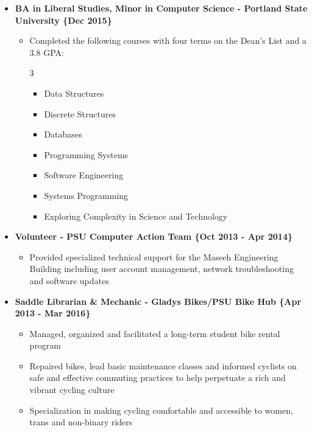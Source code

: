 \begin{itemize}
\item \textbf{BA in Liberal Studies, Minor in Computer Science - Portland State University \{Dec 2015\}}
\begin{itemize}
\item Completed the following courses with four terms on the Dean’s List and a 3.8 GPA:
\begin{multicols}{3}
\begin{itemize}
    \item Data Structures
    \item Discrete Structures
    \item Databases
    \item Programming Systems
    \item Software Engineering
    \item Systems Programming
    \item Exploring Complexity in Science and Technology
\end{itemize}
\end{multicols}
\end{itemize}


\item \textbf{Volunteer - PSU Computer Action Team  \{Oct 2013 - Apr 2014\}}
\begin{itemize}
\item Provided specialized technical support for the Maseeh Engineering Building including user account management, network troubleshooting and software updates
\end{itemize}


\item \textbf{Saddle Librarian \& Mechanic - Gladys Bikes/PSU Bike Hub  \{Apr 2013 - Mar 2016\}}
\begin{itemize}
\item Managed, organized and facilitated a long-term student bike rental program
\item Repaired bikes, lead basic maintenance classes and informed cyclists on safe and effective commuting practices to help perpetuate a rich and vibrant cycling culture
\item Specialization in making cycling comfortable and accessible to women, trans and non-binary riders
\end{itemize}



\end{itemize}
